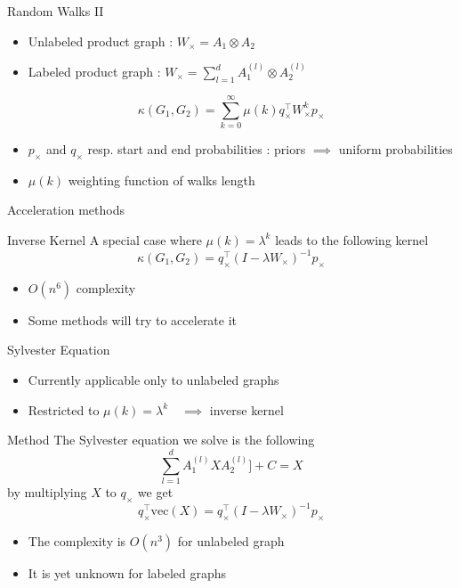 \documentclass[compress]{beamer}
\begin{document}
\begin{frame}{Random Walks II}
	\begin{itemize}
		\item Unlabeled product graph : $W_{\times}=A_1\otimes A_2$
		\item Labeled product graph : $W_{\times}=\sum\limits_{l=1}^{d} A_1^{(l)} \otimes A_2^{(l)}$
	\end{itemize}
	\begin{equation*}
	\kappa(G_1,G_2) = \sum\limits_{k=0}^{\infty}\mu(k)q_{\times}^{\top}W_{\times}^{k}p_{\times}
	\end{equation*}
	\begin{itemize}
		\item $p_\times$ and $q_\times$ resp. start and end probabilities : priors $\implies$ uniform probabilities
		\item $\mu(k)$ weighting function of walks length
	\end{itemize}
\end{frame}
\begin{frame}{Acceleration methods}
\begin{block}{Inverse Kernel}
A special case where $\mu(k)=\lambda^k$ leads to the following kernel
	\begin{equation*}
	\kappa(G_1,G_2)=q_{\times}^{\top}(I-\lambda W_\times)^{-1}p_{\times}
	\end{equation*}
\end{block}
\begin{itemize}
	\item $O(n^6)$ complexity
	\item Some methods will try to accelerate it
\end{itemize}
\end{frame}
\begin{frame}{Sylvester Equation}
\begin{itemize}
	\item Currently applicable only to unlabeled graphs
	\item Restricted to $\mu(k)=\lambda^k\quad\implies$ inverse kernel
\end{itemize}
\begin{block}{Method}
	The Sylvester equation we solve is the following
	\begin{equation*}
	\sum\limits_{l=1}^{d}A_{1}^{(l)}XA_{2}^{(l)}]+C=X
	\end{equation*}
	by multiplying $X$ to $q_\times$ we get 
	\begin{equation*}
		q_{\times}^{\top}\text{vec}(X)=q_{\times}^{\top}(I-\lambda W_{\times})^{-1}p_{\times}
	\end{equation*}
\end{block}
\begin{itemize}
	\item The complexity is $O(n^3)$ for unlabeled graph
	\item It is yet unknown for labeled graphs \citep{vishwanathan_graph_2010}
\end{itemize}
\end{frame}
\end{document}
